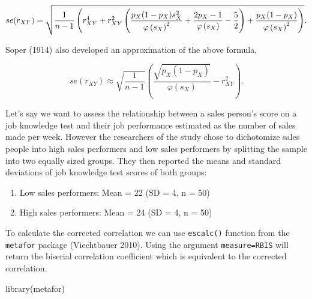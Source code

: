 \documentclass[
  letterpaper,
  DIV=11,
  numbers=noendperiod]{scrreprt}
\newenvironment{Shaded}{}{}
\newcommand{\FunctionTok}[1]{\textcolor[rgb]{0.39,0.29,0.61}{#1}}
\newcommand{\NormalTok}[1]{\textcolor[rgb]{0.12,0.11,0.11}{#1}}
\providecommand{\tightlist}{%
  \setlength{\itemsep}{0pt}\setlength{\parskip}{0pt}}\usepackage{longtable,booktabs,array}
\begin{document}
\[
\small{se(r_{XY}) = \sqrt{\frac{1}{n-1} \left(r_{XY}^4+r_{XY}^2\left(\frac{p_X(1-p_X)s_X^2}{\varphi\left(s_X\right)^2} + \frac{2p_X - 1}{\varphi\left(s_X\right)} -\frac{5}{2}\right)+\frac{p_X(1-p_X)}{\varphi\left(s_X\right)^2}\right)}}.
\]

Soper (1914) also developed an approximation of the above formula,

\[
se(r_{XY}) \approx \sqrt{\frac{1}{n-1}} \left(\frac{\sqrt{p_X(1-p_X)}}{\varphi\left(s_X\right)}-r_{XY}^2\right).
\]

\begin{tcolorbox}[enhanced jigsaw, opacityback=0, coltitle=black, toprule=.15mm, colframe=quarto-callout-note-color-frame, bottomtitle=1mm, rightrule=.15mm, colbacktitle=quarto-callout-note-color!10!white, left=2mm, bottomrule=.15mm, breakable, title={Applied Example in R}, colback=white, opacitybacktitle=0.6, titlerule=0mm, arc=.35mm, leftrule=.75mm, toptitle=1mm]

Let's say we want to assess the relationship between a sales person's
score on a job knowledge test and their job performance estimated as the
number of sales made per week. However the researchers of the study
chose to dichotomize sales people into high sales performers and low
sales performers by splitting the sample into two equally sized groups.
They then reported the means and standard deviations of job knowledge
test scores of both groups:

\begin{enumerate}
\def\labelenumi{\arabic{enumi}.}
\tightlist
\item
  Low sales performers: Mean = 22 (SD = 4, n = 50)
\item
  High sales performers: Mean = 24 (SD = 4, n = 50)
\end{enumerate}

To calculate the corrected correlation we can use \texttt{escalc()}
function from the \texttt{metafor} package (Viechtbauer 2010). Using the
argument \texttt{measure=\textquotesingle{}RBIS\textquotesingle{}} will
return the biserial correlation coefficient which is equivalent to the
corrected correlation.

\begin{Shaded}
\begin{Highlighting}[]
\FunctionTok{library}\NormalTok{(metafor)}


\end{Highlighting}
\end{Shaded}
\end{tcolorbox}
\end{document}
